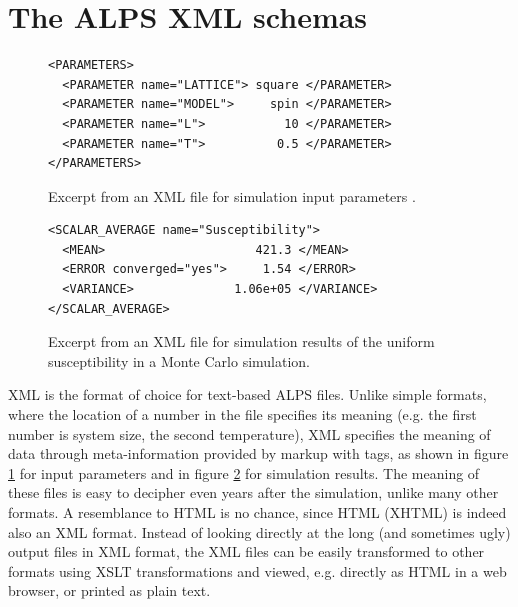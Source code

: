 \documentclass[12pt]{iopart}
\begin{document}
\section{The ALPS XML schemas}
\label{sec:xml}

\begin{figure}[tb]
\begin{lstlisting}
<PARAMETERS>
  <PARAMETER name="LATTICE"> square </PARAMETER>
  <PARAMETER name="MODEL">     spin </PARAMETER>
  <PARAMETER name="L">           10 </PARAMETER>
  <PARAMETER name="T">          0.5 </PARAMETER>
</PARAMETERS>
\end{lstlisting}
\caption{Excerpt from an XML file for simulation input parameters .}
\label{fig:parm}
\end{figure}
\begin{figure}[tb]
\begin{lstlisting}
<SCALAR_AVERAGE name="Susceptibility">
  <MEAN>                     421.3 </MEAN>
  <ERROR converged="yes">     1.54 </ERROR>
  <VARIANCE>              1.06e+05 </VARIANCE>
</SCALAR_AVERAGE>
\end{lstlisting}
\caption{Excerpt from an XML file for simulation results of the uniform susceptibility in a Monte Carlo simulation.}
\label{fig:result}
\end{figure}


XML is the format of choice for text-based ALPS files. Unlike simple formats, where the location of a number in the file specifies its meaning (e.g. the first number is system size, the second temperature), XML specifies the meaning of data through meta-information provided by markup with tags, as shown in figure \ref{fig:parm} for input parameters and in  figure \ref{fig:result} for simulation results. The meaning of these files is easy to decipher even years after the simulation, unlike many other formats. A resemblance to HTML is no chance, since HTML (XHTML) is indeed also an XML format. Instead of looking directly at the long (and sometimes ugly) output files in XML format, the XML files can be easily transformed to other formats using XSLT transformations\cite{xslt} and viewed, e.g. directly as HTML in a web browser, or printed as plain text. 
\end{document}
